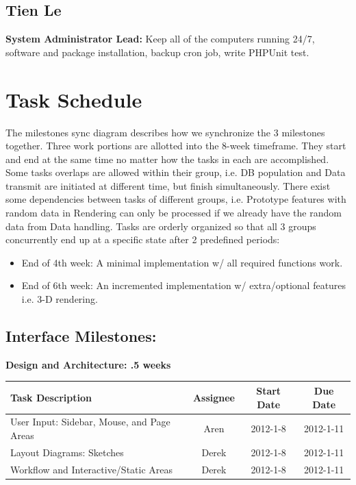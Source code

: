 \documentclass[12pt, letterpaper]{article}
\begin{document}
  \subsection{Tien Le}
  {\bf System Administrator Lead:} Keep all of the computers running 24/7, software and package installation, backup cron job, write PHPUnit test. 

\section{Task Schedule}

The milestones sync diagram describes how we synchronize the 3 milestones together. Three work portions are allotted into the 8-week timeframe. They start and end at the same time no matter how the tasks in each are accomplished. Some tasks overlaps are allowed within their group, i.e. DB population and Data transmit are initiated at different time, but finish simultaneously. There exist some dependencies between tasks of different groups, i.e. Prototype features with random data in Rendering can only be processed if we already have the random data from Data handling. Tasks are orderly organized so that all 3 groups concurrently end up at a specific state after 2 predefined periods:
  \begin{itemize}
    \item End of 4th week:  A minimal implementation w/ all required functions work.
    \item End of 6th week: An incremented implementation w/ extra/optional features i.e. 3-D rendering.
  \end{itemize}
  \subsection{Interface Milestones:}
	
  \begin{center}
		{\bf Design and Architecture: .5 weeks}
    \begin{tabular}{| p{8.3cm} || c | c | c | }
      \hline
      Task Description & Assignee & Start Date & Due Date \\
      \hline
	    User Input: Sidebar, Mouse, and Page Areas & Aren & 2012-1-8 & 2012-1-11 \\
	    Layout Diagrams: Sketches & Derek & 2012-1-8 & 2012-1-11 \\
	    Workflow and Interactive/Static Areas & Derek & 2012-1-8 & 2012-1-11 \\
      \hline
    \end{tabular}
  \end{center}
\end{document}
